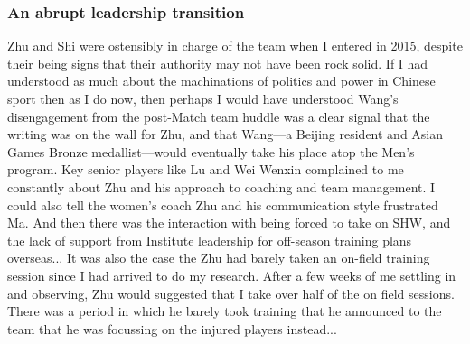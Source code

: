 \begin{CJK}{UTF8}{gbsn}



\subsubsection{An abrupt leadership transition}
Zhu and Shi were ostensibly in charge of the team when I entered in 2015, despite their being signs that their authority may not have been rock solid.  If I had understood as much about the machinations of politics and power in Chinese sport then as I do now, then perhaps I would have understood Wang's disengagement from the post-Match team huddle was a clear signal that the writing was on the wall for Zhu, and that Wang---a Beijing resident and Asian Games Bronze medallist---would eventually take his place atop the Men's program.  Key senior players like Lu and Wei Wenxin complained to me constantly about Zhu and his approach to coaching and team management.  I could also tell the women's coach Zhu and his communication style frustrated Ma.  And then there was the interaction with being forced to take on SHW, and the lack of support from Institute leadership for off-season training plans overseas... It was also the case the Zhu had barely taken an on-field training session since I had arrived to do my research.  After a few weeks of me settling in and observing, Zhu would suggested that I take over half of the on field sessions.  There was a period in which he barely took training that he announced to the team that he was focussing on the injured players instead...


\end{CJK}
